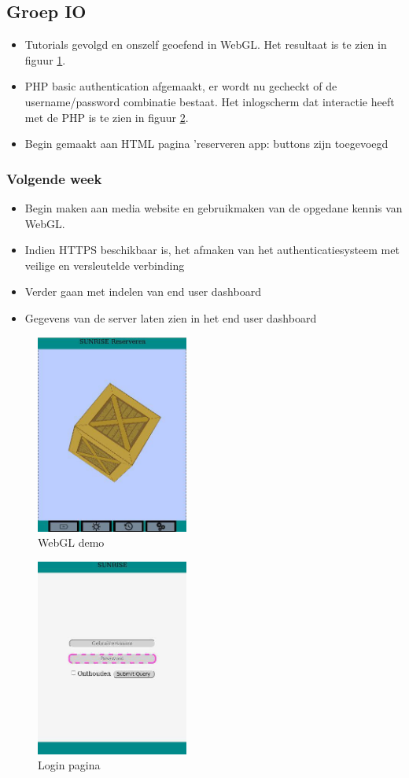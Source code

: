 \subsection*{Groep IO}
\begin{itemize}
\item Tutorials gevolgd en onszelf geoefend in WebGL. Het resultaat is te zien in figuur \ref{fig:WebGL}.
\item PHP basic authentication afgemaakt, er wordt nu gecheckt of de username/password combinatie bestaat. Het inlogscherm dat interactie heeft met de PHP is te zien in figuur \ref{fig:login}.
\item Begin gemaakt aan HTML pagina 'reserveren app: buttons zijn toegevoegd
\end{itemize}

\subsubsection*{Volgende week}
\begin{itemize}
\item Begin maken aan media website en gebruikmaken van de opgedane kennis van WebGL.
\item Indien HTTPS beschikbaar is, het afmaken van het authenticatiesysteem met veilige en versleutelde verbinding
\item Verder gaan met indelen van end user dashboard
\item Gegevens van de server laten zien in het end user dashboard
\end{itemize}


\begin{figure}[htbp]
\centering
\includegraphics[width=5cm]{images/WebGL.jpg}
\caption{WebGL demo}\label{fig:WebGL}
\end{figure}

\begin{figure}[htbp]
\centering
\includegraphics[width=5cm]{images/login.jpg}
\caption{Login pagina}\label{fig:login}
\end{figure}
